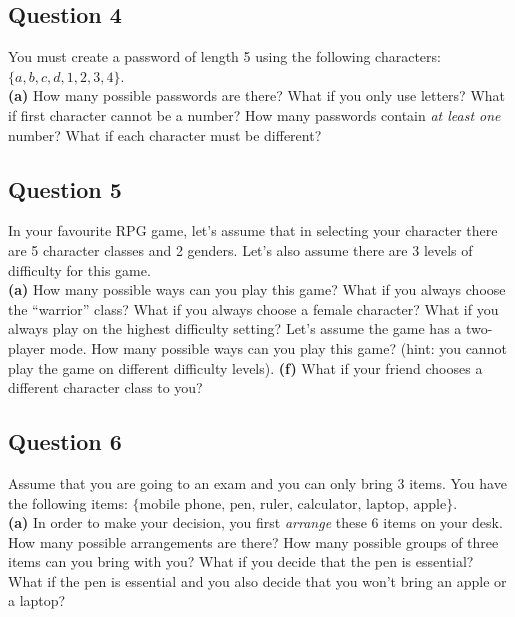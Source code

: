 \documentclass[12pt]{article}
\begin{document}
\subsection*{Question 4}
You must create a password of length 5 using the following characters:
$\{a,b,c,d,1,2,3,4\}$.\\[-0.2cm]

{\bf(a)} How many possible passwords are there?  What if you only use letters?  What if first character cannot be a number?  How many passwords contain \emph{at least one} number?  What if each character must be different?


\subsection*{Question 5}
In your favourite RPG game, let's assume that in selecting your character there are 5 character classes and 2 genders. Let's also assume there are 3 levels of difficulty for this game.\\[-0.2cm]

{\bf(a)} How many possible ways can you play this game?  What if you always choose the ``warrior'' class?  What if you always choose a female character?  What if you always play on the highest difficulty setting?  Let's assume the game has a two-player mode. How many possible ways can you play this game? (hint: you cannot play the game on different difficulty levels). {\bf(f)} What if your friend chooses a different character class to you?


\subsection*{Question 6}
Assume that you are going to an exam and you can only bring 3 items. You have the following items: $\{\text{mobile phone, } \text{pen, } \text{ruler, } \text{calculator, } \text{laptop, } \text{apple} \}$.\\[-0.2cm]

{\bf(a)} In order to make your decision, you first \emph{arrange} these 6 items on your desk. How many possible arrangements are there?  How many possible groups of three items can you bring with you?  What if you decide that the pen is essential?  What if the pen is essential and you also decide that you won't bring an apple or a laptop?
\end{document}
